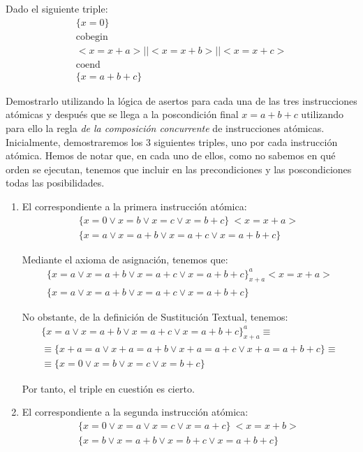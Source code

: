 \begin{ejercicio}
    Dado el siguiente triple:
    \begin{gather*}
        \{x = 0\} \\
        \text{cobegin} \\
        <x = x + a> || <x = x + b> || <x = x + c> \\
        \text{coend} \\
        \{x = a + b + c\}
    \end{gather*}
    
    Demostrarlo utilizando la lógica de asertos para cada una de las tres instrucciones atómicas y después que se llega a la poscondición final $x = a + b + c$ utilizando para ello la regla \emph{de la composición concurrente} de instrucciones atómicas.\\

Inicialmente, demostraremos los $3$ siguientes triples, uno por cada instrucción atómica. Hemos de notar que, en cada uno de ellos, como no sabemos en qué orden se ejecutan, tenemos que incluir en las precondiciones y las poscondiciones todas las posibilidades.
\begin{enumerate}
    \item El correspondiente a la primera instrucción atómica:
    \begin{gather*}
        \{x=0 \lor x=b \lor x=c \lor x=b+c\}\ <x=x+a>\ \\ \{x=a \lor x=a+b \lor x=a+c \lor x=a+b+c\}
    \end{gather*}

    Mediante el axioma de asignación, tenemos que:
    \begin{gather*}
        \{x=a \lor x=a+b \lor x=a+c \lor x=a+b+c\}_{x+a}^a <x=x+a>\\ \{x=a \lor x=a+b \lor x=a+c \lor x=a+b+c\}
    \end{gather*}

    No obstante, de la definición de Sustitución Textual, tenemos:
    \begin{gather*}
        \{x=a \lor x=a+b \lor x=a+c \lor x=a+b+c\}_{x+a}^a \equiv \\
        \equiv \{x+a=a \lor x+a=a+b \lor x+a=a+c \lor x+a=a+b+c\} \equiv \\
        \equiv \{x=0 \lor x=b \lor x=c \lor x=b+c\}
    \end{gather*}

    Por tanto, el triple en cuestión es cierto.

    \item El correspondiente a la segunda instrucción atómica:
    \begin{gather*}
        \{x=0 \lor x=a \lor x=c \lor x=a+c\}\ <x=x+b>\ \\ \{x=b \lor x=a+b \lor x=b+c \lor x=a+b+c\}
    \end{gather*}


\end{enumerate}
\end{ejercicio}
